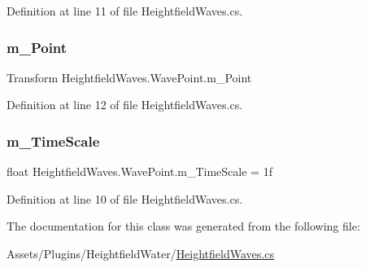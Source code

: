 Definition at line 11 of file Heightfield\+Waves.\+cs.

\mbox{\label{class_heightfield_waves_1_1_wave_point_a83af183ce83dc2d1e85771bc0a8effb3}} 
\subsubsection{\texorpdfstring{m\+\_\+\+Point}{m\_Point}}
{\footnotesize\ttfamily Transform Heightfield\+Waves.\+Wave\+Point.\+m\+\_\+\+Point}



Definition at line 12 of file Heightfield\+Waves.\+cs.

\mbox{\label{class_heightfield_waves_1_1_wave_point_a2b3996ebc7dcc1348171a34c3e46c5a9}} 
\subsubsection{\texorpdfstring{m\+\_\+\+Time\+Scale}{m\_TimeScale}}
{\footnotesize\ttfamily float Heightfield\+Waves.\+Wave\+Point.\+m\+\_\+\+Time\+Scale = 1f}



Definition at line 10 of file Heightfield\+Waves.\+cs.



The documentation for this class was generated from the following file\+:\begin{DoxyCompactItemize}
\item 
Assets/\+Plugins/\+Heightfield\+Water/\mbox{\hyperlink{_heightfield_waves_8cs}{Heightfield\+Waves.\+cs}}\end{DoxyCompactItemize}
